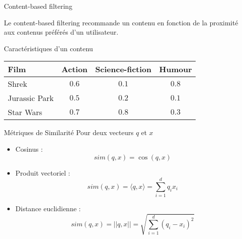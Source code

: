 \begin{frame}{Content-based filtering}
  \begin{minipage}{0.49\linewidth}
    Le \alert{content-based filtering} recommande un contenu en fonction de la proximité aux contenus préférés d'un utilisateur.
  \end{minipage}
  \begin{minipage}{0.49\linewidth}
  \end{minipage}
\end{frame}

\begin{frame}{Caractéristiques d'un contenu}
  \centering
  \begin{tabular}{|l|c|c|c|}
    \toprule
    Film & Action & Science-fiction & Humour\\
    \midrule
    Shrek & $0.6$ & $0.1$ & $0.8$\\
    \midrule
    Jurassic Park & $0.5$ & $0.2$ & $0.1$\\
    \midrule
    Star Wars & $0.7$ & $0.8$ & $0.3$\\
    \bottomrule
  \end{tabular}
\end{frame}

\begin{frame}{Métriques de Similarité}
  Pour deux  vecteurs $q$ et $x$
  \begin{itemize}
    \item Cosinus : 
     $$sim(q,x) = \cos(q,x)$$
    \item Produit vectoriel :
     $$sim(q,x) = \langle q,x\rangle = \sum^d_{i=1}q_i x_i$$
    \item Distance euclidienne :
     $$sim(q,x) = ||q,x|| = \sqrt{\sum^d_{i=1}(q_i-x_i)^2}$$
  \end{itemize}
\end{frame}

